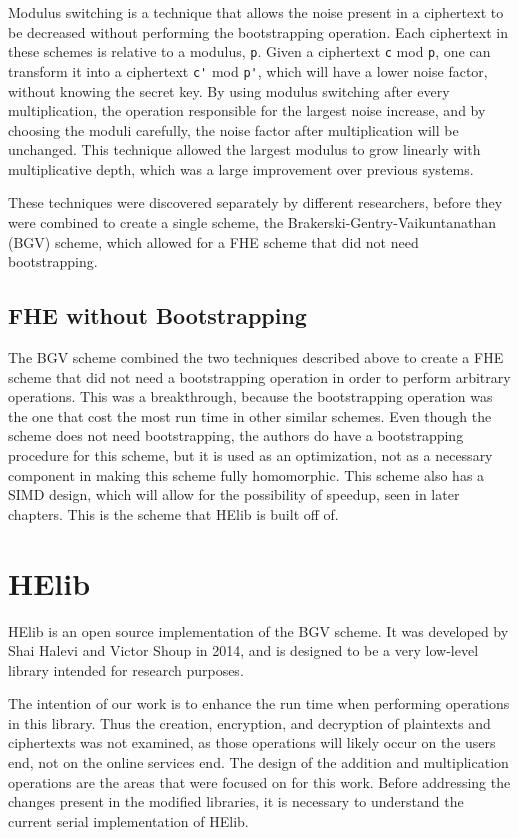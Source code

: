 Modulus switching \cite{coron2012public} is a technique that allows the noise present in a ciphertext to be decreased without performing the bootstrapping operation. Each ciphertext in these schemes is relative to a modulus, \verb|p|. Given a ciphertext \verb|c| mod \verb|p|, one can transform it into a ciphertext \verb|c'| mod \verb|p'|, which will have a lower noise factor, without knowing the secret key. By using modulus switching after every multiplication, the operation responsible for the largest noise increase, and by choosing the moduli carefully, the noise factor after multiplication will be unchanged. This technique allowed the largest modulus to grow linearly with multiplicative depth, which was a large improvement over previous systems.

These techniques were discovered separately by different researchers, before they were combined to create a single scheme, the Brakerski-Gentry-Vaikuntanathan (BGV) scheme, which allowed for a FHE scheme that did not need bootstrapping.

\subsection{FHE without Bootstrapping}
The BGV scheme \cite{cryptoeprint:2011:277} combined the two techniques described above to create a FHE scheme that did not need a bootstrapping operation in order to perform arbitrary operations. This was a breakthrough, because the bootstrapping operation was the one that cost the most run time in other similar schemes. Even though the scheme does not need bootstrapping, the authors do have a bootstrapping procedure for this scheme, but it is used as an optimization, not as a necessary component in making this scheme fully homomorphic. This scheme also has a SIMD design, which will allow for the possibility of speedup, seen in later chapters. This is the scheme that HElib is built off of.

\section{HElib}
HElib \cite{cryptoeprint:2014:106, cryptoeprint:2014:873, halevi2013design} is an open source implementation of the BGV scheme. It was developed by Shai Halevi and Victor Shoup in 2014, and is designed to be a very low-level library intended for research purposes. 

The intention of our work is to enhance the run time when performing operations in this library. Thus the creation, encryption, and decryption of plaintexts and ciphertexts was not examined, as those operations will likely occur on the users end, not on the online services end. The design of the addition and multiplication operations are the areas that were focused on for this work. Before addressing the changes present in the modified libraries, it is necessary to understand the current serial implementation of HElib. 


